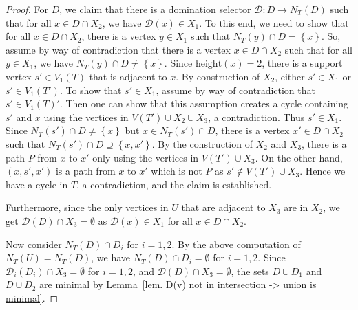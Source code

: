 \documentclass[10pt,a4paper]{amsart}
\newcommand{\calD}{\mathcal{D}}
\newcommand{\hh}{\mbox{height}}
\newcommand\set[1]{\left\lbrace #1 \right\rbrace}
\begin{document}
\begin{proof}
    For $D$, we claim that there is a domination selector $\calD: D \to N_T(D)$ such that for all $x \in D \cap X_2$, we have $\calD(x) \in X_1$.
    To this end, we need to show that for all $x \in D \cap X_2$, there is a vertex $y \in X_1$ such that $N_T(y) \cap D = \set{x}$.
    So, assume by way of contradiction that there is a vertex $x \in D \cap X_2$ such that for all $y\in X_1$, we have $N_T(y) \cap D \neq \set{x}$.
    Since $\hh(x) = 2$, there is a support vertex $s' \in V_1(T)$ that is adjacent to $x$.
    By construction of $X_2$, either $s' \in X_1$ or $s' \in V_1(T')$.
    To show that $s' \in X_1$, assume by way of contradiction that $s' \in V_1(T)'$.
    Then one can show that this assumption creates a cycle containing $s'$ and $x$ using the vertices in $V(T') \cup X_2 \cup X_3$, a contradiction.
    Thus $s' \in X_1$.
    Since $N_T(s') \cap D \neq \set{x}$ but $x \in N_T(s') \cap D$, there is a vertex $x' \in D \cap X_2$ such that $N_T(s') \cap D \supseteq \set{x,x'}$.
    By the construction of $X_2$ and $X_3$, there is a path $P$ from $x$ to $x'$ only using the vertices in $V(T') \cup X_3$.
    On the other hand, $(x,s',x')$ is a path from $x$ to $x'$ which is not $P$ as $s' \not \in V(T') \cup X_3$.
    Hence we have a cycle in $T$, a contradiction, and the claim is established.

    Furthermore, since the only vertices in $U$ that are adjacent to $X_3$ are in $X_2$, we get $\calD(D) \cap X_3 = \emptyset$ as $\calD(x) \in X_1$ for all $x \in D \cap X_2$.

    Now consider $N_T(D) \cap D_i$ for $i = 1,2$.
    By the above computation of $N_T(U) = N_T(D)$, we have $N_T(D) \cap D_i =\emptyset$ for $i = 1,2$.
    Since $\calD_i(D_i) \cap X_3 = \emptyset$ for $i = 1,2$, and $\calD(D) \cap X_3 = \emptyset$, the sets $D \cup D_1$ and $D \cup D_2$ are minimal by Lemma~\ref{lem. D(v) not in intersection -> union is minimal}. 
\end{proof}  
\end{document}
